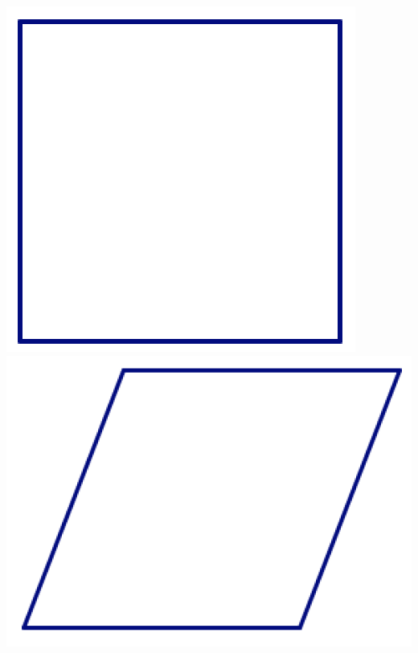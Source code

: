 \begin{center}
\includegraphics[scale = .45]{square2}
\qquad\qquad
\includegraphics[scale = .45]{rhomb1}


\end{center}
